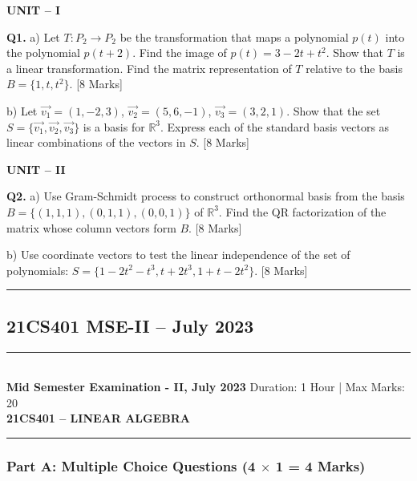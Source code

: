 \documentclass[11pt,a4paper]{article}
\newcommand{\examheader}[4]{
\noindent\rule{\textwidth}{0.5pt}\\
\textbf{#1} \hfill Duration: #3 | Max Marks: #4\\
\textbf{#2}\\
\rule{\textwidth}{0.5pt}
\vspace{0.2cm}
}
\begin{document}
\textbf{UNIT -- I}

\textbf{Q1.} a) Let $T: P_2 \to P_2$ be the transformation that maps a polynomial $p(t)$ into the polynomial $p(t+2)$. Find the image of $p(t) = 3 - 2t + t^2$. Show that $T$ is a linear transformation. Find the matrix representation of $T$ relative to the basis $B = \{1, t, t^2\}$. \hfill [8 Marks]

b) Let $\vec{v_1} = (1, -2, 3)$, $\vec{v_2} = (5, 6, -1)$, $\vec{v_3} = (3, 2, 1)$. Show that the set $S = \{\vec{v_1}, \vec{v_2}, \vec{v_3}\}$ is a basis for $\mathbb{R}^3$. Express each of the standard basis vectors as linear combinations of the vectors in $S$. \hfill [8 Marks]

\textbf{UNIT -- II}

\textbf{Q2.} a) Use Gram-Schmidt process to construct orthonormal basis from the basis $B = \{(1,1,1), (0,1,1), (0,0,1)\}$ of $\mathbb{R}^3$. Find the QR factorization of the matrix whose column vectors form $B$. \hfill [8 Marks]

b) Use coordinate vectors to test the linear independence of the set of polynomials: $S = \{1 - 2t^2 - t^3, t + 2t^3, 1 + t - 2t^2\}$. \hfill [8 Marks]

\vspace{0.5cm}
\hrule
\vspace{0.5cm}

\subsection{21CS401 MSE-II -- July 2023}
\examheader{Mid Semester Examination - II, July 2023}{21CS401 -- LINEAR ALGEBRA}{1 Hour}{20}

\subsubsection*{Part A: Multiple Choice Questions (4 $\times$ 1 = 4 Marks)}
\end{document}
